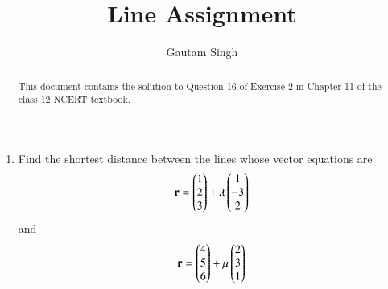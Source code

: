 \documentclass[journal,12pt,twocolumn]{IEEEtran}
\let\vec\mathbf
\begin{document}
\vspace{3cm}
\title{Line Assignment}
\author{Gautam Singh}
\maketitle
\bigskip

\begin{abstract}
    This document contains the solution to Question 16 of Exercise 2 in Chapter
    11 of the class 12 NCERT textbook.
\end{abstract}

\begin{enumerate}
    \item Find the shortest distance between the lines whose vector equations are
    \begin{align}
        \vec{r} = \myvec{1\\2\\3} + \lambda\myvec{1\\-3\\2}
        \label{eq:L1}
    \end{align}
    and
    \begin{align}
        \vec{r} = \myvec{4\\5\\6} + \mu\myvec{2\\3\\1}
        \label{eq:L2}
    \end{align}


\end{enumerate}
\end{document}
